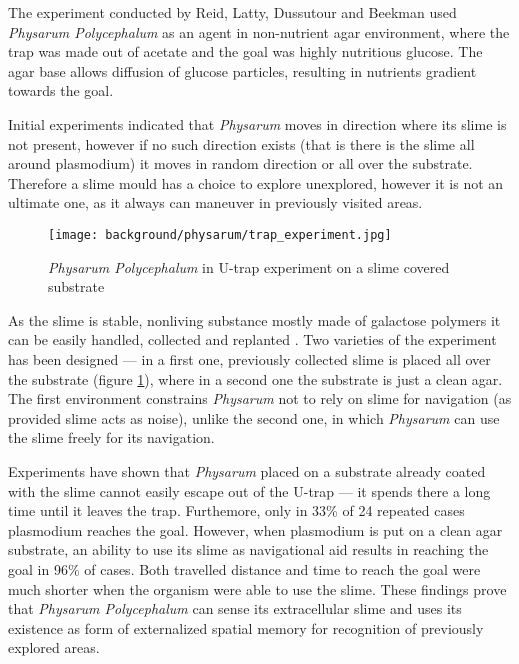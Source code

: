 The experiment conducted by Reid, Latty, Dussutour and Beekman \cite{reid2012slime} used \textit{Physarum Polycephalum} as an agent in non-nutrient agar environment, where the trap was made out of acetate and the goal was highly nutritious glucose. The agar base allows diffusion of glucose particles, resulting in nutrients gradient towards the goal.

Initial experiments indicated that \textit{Physarum} moves in direction where its slime is not present, however if no such direction exists (that is there is the slime all around plasmodium) it moves in random direction or all over the substrate. Therefore a slime mould has a choice to explore unexplored, however it is not an ultimate one, as it always can maneuver in previously visited areas. 

\begin{figure}
  \centering
  \texttt{[image: background/physarum/trap\_experiment.jpg]}
  \caption{\textit{Physarum Polycephalum} in U-trap experiment on a slime covered substrate \cite{reid2012slime}}
  \label{figure:bp_trap_experiment}
\end{figure}

As the slime is stable, nonliving substance mostly made of galactose polymers it can be easily handled, collected and replanted \cite{mccormick1970isolation}. Two varieties of the experiment has been designed --- in a first one, previously collected slime is placed all over the substrate (figure \ref{figure:bp_trap_experiment}), where in a second one the substrate is just a clean agar. The first environment constrains \textit{Physarum} not to rely on slime for navigation (as provided slime acts as noise), unlike the second one, in which \textit{Physarum} can use the slime freely for its navigation.

Experiments have shown that \textit{Physarum} placed on a substrate already coated with the slime cannot easily escape out of the U-trap --- it spends there a long time until it leaves the trap. Furthemore, only in 33\% of 24 repeated cases plasmodium reaches the goal. However, when plasmodium is put on a clean agar substrate, an ability to use its slime as navigational aid results in reaching the goal in 96\% of cases. Both travelled distance and time to reach the goal were much shorter when the organism were able to use the slime. These findings prove that \textit{Physarum Polycephalum} can sense its extracellular slime and uses its existence as form of externalized spatial memory for recognition of previously explored areas.


